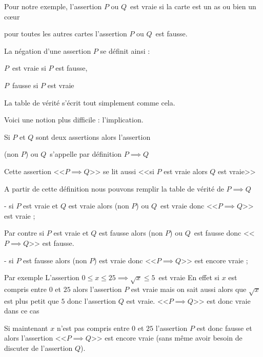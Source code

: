 Pour notre exemple, l'assertion  \og $P$ ou $Q$\fg\ est vraie si la carte est un as ou bien un c\oe ur

pour toutes les autres cartes l'assertion \og $P$ ou $Q$\fg\ est fausse.


\diapo

La négation d'une assertion $P$ se définit ainsi :

\og {} $P$\fg\ est vraie si $P$ est fausse, 

\og {} $P$\fg\ fausse si $P$ est vraie

La table de vérité s'écrit tout simplement comme cela.


\diapo

Voici une notion plus difficile : l'implication.

Si $P$ et $Q$ sont deux assertions alors l'assertion

\og (non $P$) ou $Q$\fg\ s'appelle par définition \og $P \implies Q$\fg


Cette assertion <<$P \implies Q$>>  se lit aussi 
<<si $P$ est vraie alors $Q$ est vraie>>

\change

A partir de cette définition nous pouvons remplir la table de vérité
de \og $P \implies Q$\fg


\change

- si $P$ est vraie et $Q$ est vraie alors \og (non $P$) ou $Q$\fg \ est vraie donc <<$P \implies Q$>> est vraie ;

\change

Par contre si
  $P$ est vraie et $Q$ est fausse alors \og (non $P$) ou $Q$\fg \ est fausse 
donc <<$P \implies Q$>> est fausse.

\change

- si $P$ est fausse alors (non $P$) est vraie donc <<$P \implies Q$>> est encore vraie ;



\change


Par exemple 
 L'assertion  \og $0 \le x \le 25 \implies \sqrt x \le 5$\fg\  est vraie 
En effet si $x$ est compris entre $0$ et $25$ alors l'assertion $P$ est vraie
mais on sait aussi alors que $\sqrt x$ est plus petit que $5$ donc l'assertion $Q$ est vraie.
<<$P \implies Q$>>  est donc vraie dans ce cas

Si maintenant $x$ n'est pas compris entre $0$ et $25$ l'assertion $P$ est donc fausse
et alors l'assertion <<$P \implies Q$>> est encore vraie (sans même avoir besoin de 
discuter de l'assertion $Q$).

